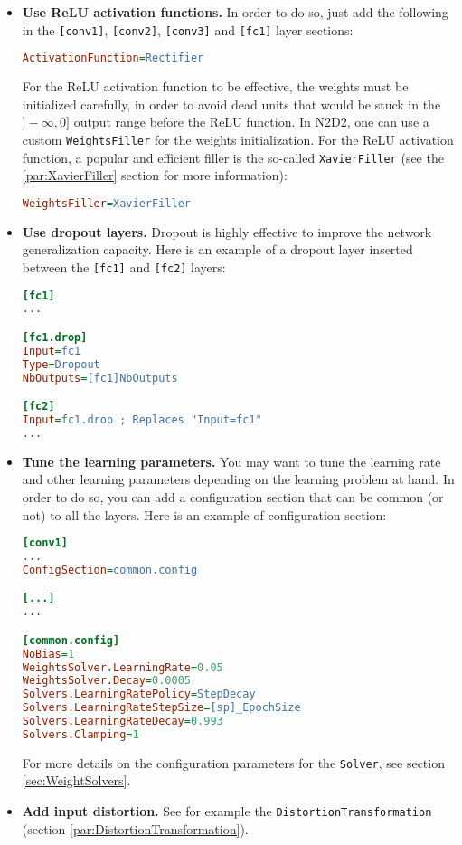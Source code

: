 \documentclass[a4paper,11pt,oneside]{article}
\newenvironment{myitemize}
{ \begin{itemize}
    \setlength{\itemsep}{0pt}
    \setlength{\parskip}{0pt}
    \setlength{\parsep}{0pt}     }
{ \end{itemize}                  }
\begin{document}
\begin{myitemize}
\item \textbf{Use ReLU activation functions.}
In order to do so, just add the following
in the \lstinline![conv1]!,  \lstinline![conv2]!, \lstinline![conv3]! and
\lstinline![fc1]! layer sections:

\begin{lstlisting}[language=ini]
ActivationFunction=Rectifier
\end{lstlisting}

For the ReLU activation function to be effective, the weights must be
initialized carefully, in order to avoid dead units that would be stuck in the
$]-\infty,0]$ output range before the ReLU function. In N2D2, one can use a
custom \lstinline!WeightsFiller! for the weights initialization. For the ReLU
activation function, a popular and efficient filler is the so-called
\lstinline!XavierFiller! (see the \ref{par:XavierFiller} section for more
information):

\begin{lstlisting}[language=ini]
WeightsFiller=XavierFiller
\end{lstlisting}

\item \textbf{Use dropout layers.}
Dropout is highly effective to improve the network
generalization capacity. Here is an example of a dropout layer inserted between
the \lstinline![fc1]! and \lstinline![fc2]! layers:

\begin{lstlisting}[language=ini]
[fc1]
...

[fc1.drop]
Input=fc1
Type=Dropout
NbOutputs=[fc1]NbOutputs

[fc2]
Input=fc1.drop ; Replaces "Input=fc1"
...
\end{lstlisting}

\item \textbf{Tune the learning parameters.}
You may want to tune the learning rate and other learning parameters depending
on the learning problem at hand. In order to do so, you can add a configuration
section that can be common (or not) to all the layers. Here is an example of
configuration section:

\begin{lstlisting}[language=ini]
[conv1]
...
ConfigSection=common.config

[...]
...

[common.config]
NoBias=1
WeightsSolver.LearningRate=0.05
WeightsSolver.Decay=0.0005
Solvers.LearningRatePolicy=StepDecay
Solvers.LearningRateStepSize=[sp]_EpochSize
Solvers.LearningRateDecay=0.993
Solvers.Clamping=1
\end{lstlisting}

For more details on the configuration parameters for the \lstinline!Solver!, see
section \ref{sec:WeightSolvers}.

\item \textbf{Add input distortion.} See for example the
\lstinline!DistortionTransformation! (section
\ref{par:DistortionTransformation}).
\end{myitemize}
\end{document}

